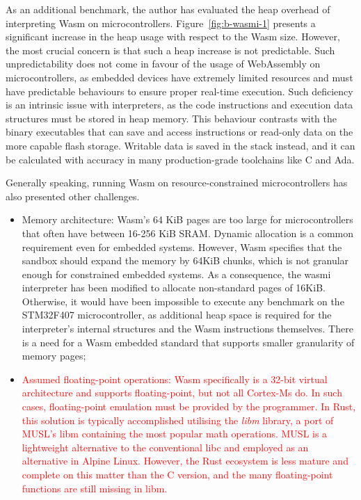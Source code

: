 As an additional benchmark, the author has evaluated the heap overhead of interpreting Wasm on microcontrollers. 
Figure~\ref{fig:b-wasmi-1} presents a significant increase in the heap usage with respect to the Wasm size. However, the most crucial concern is that such a heap increase is not predictable. Such unpredictability does not come in favour of the usage of WebAssembly on microcontrollers, as embedded devices have extremely limited resources and must have predictable behaviours to ensure proper real-time execution. Such deficiency is an intrinsic issue with interpreters, as the code instructions and execution data structures must be stored in heap memory. This behaviour contrasts with the binary executables that can save and access instructions or read-only data on the more capable flash storage. Writable data is saved in the stack instead, and it can be calculated with accuracy in many production-grade toolchains like C and Ada.

Generally speaking, running Wasm on resource-constrained microcontrollers has also presented other challenges.

\begin{itemize}
    \item Memory architecture: Wasm's 64 KiB pages are too large for microcontrollers that often have between 16-256 KiB SRAM. Dynamic allocation is a common requirement even for embedded systems. However, Wasm specifies that the sandbox should expand the memory by 64KiB chunks, which is not granular enough for constrained embedded systems. As a consequence, the wasmi interpreter has been modified to allocate non-standard pages of 16KiB. Otherwise, it would have been impossible to execute any benchmark on the STM32F407 microcontroller, as additional heap space is required for the interpreter's internal structures and the Wasm instructions themselves. There is a need for a Wasm embedded standard that supports smaller granularity of memory pages;
    \item \textcolor{red}{Assumed floating-point operations: Wasm specifically is a 32-bit virtual architecture and supports floating-point, but not all Cortex-Ms do. In such cases, floating-point emulation must be provided by the programmer. In Rust, this solution is typically accomplished utilising the \emph{libm} library, a port of MUSL's libm containing the most popular math operations. MUSL is a lightweight alternative to the conventional libc and employed as an alternative in Alpine Linux. However, the Rust ecosystem is less mature and complete on this matter than the C version, and the many floating-point functions are still missing in libm.} 
\end{itemize}

